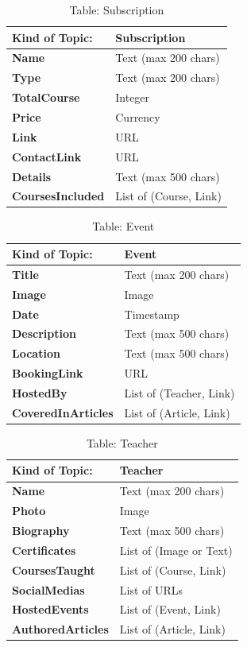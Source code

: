 \begin{table}[H]
\centering
\begin{tabularx}{\textwidth}{|>{\bfseries}l|X|}
\hline
Kind of Topic: & \textbf{Subscription} \\
\hline
Name & Text (max 200 chars) \\
\hline
Type & Text (max 200 chars) \\
\hline
TotalCourse & Integer \\
\hline
Price & Currency \\
\hline
Link & URL \\
\hline
ContactLink & URL \\
\hline
Details & Text (max 500 chars) \\
\hline
CoursesIncluded & List of (Course, Link) \\
\hline
\end{tabularx}
\caption{Table: Subscription}
\end{table}

\begin{table}[H]
\centering
\begin{tabularx}{\textwidth}{|>{\bfseries}l|X|}
\hline
Kind of Topic: & \textbf{Event} \\
\hline
Title & Text (max 200 chars) \\
\hline
Image & Image \\
\hline
Date & Timestamp \\
\hline
Description & Text (max 500 chars) \\
\hline
Location & Text (max 500 chars) \\
\hline
BookingLink & URL \\
\hline
HostedBy & List of (Teacher, Link) \\
\hline
CoveredInArticles & List of (Article, Link) \\
\hline
\end{tabularx}
\caption{Table: Event}
\end{table}

\begin{table}[H]
\centering
\begin{tabularx}{\textwidth}{|>{\bfseries}l|X|}
\hline
Kind of Topic: & \textbf{Teacher} \\
\hline
Name & Text (max 200 chars) \\
\hline
Photo & Image \\
\hline
Biography & Text (max 500 chars) \\
\hline
Certificates & List of (Image or Text) \\
\hline
CoursesTaught & List of (Course, Link) \\
\hline
SocialMedias & List of URLs \\
\hline
HostedEvents & List of (Event, Link) \\
\hline
AuthoredArticles & List of (Article, Link) \\
\hline
\end{tabularx}
\caption{Table: Teacher}
\end{table}


